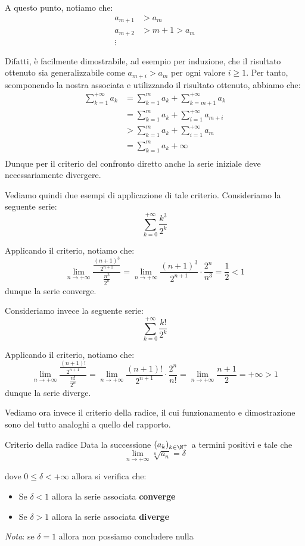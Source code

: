 \documentclass[a4paper, 12pt]{report}
\begin{document}
{        A questo punto, notiamo che:
        \[\begin{split}
            a_{m+1} &> a_m \\
            a_{m+2} &> {m+1} > a_{m}\\
            \vdots
        \end{split}\]

        Difatti, è facilmente dimostrabile, ad esempio per induzione, che il risultato ottenuto sia generalizzabile come $a_{m+i} > a_m$ per ogni valore $i \geq 1$.  Per tanto, scomponendo la nostra associata e utilizzando il risultato ottenuto, abbiamo che:
        \[\begin{split}
            \sum_{k = 1}^{+\infty} a_k &= \sum_{k = 1}^{m} a_k + \sum_{k = m+1}^{+\infty} a_k\\
            &= \sum_{k = 1}^{m} a_k + \sum_{i = 1}^{+\infty} a_{m+i} \\
            &> \sum_{k = 1}^{m} a_k + \sum_{i = 1}^{+\infty} a_{m} \\
            &= \sum_{k = 1}^{m} a_k + \infty \\
        \end{split}\]
        Dunque per il criterio del confronto diretto anche la serie iniziale deve necessariamente divergere.

    }

    Vediamo quindi due esempi di applicazione di tale criterio. Consideriamo la seguente serie:
    \[\sum_{k = 0}^{+\infty} \frac{k^3}{2^k}\]

    Applicando il criterio, notiamo che:
    \[\lim_{n \to +\infty} \frac{\frac{(n+1)^3}{2^{n+1}}}{\frac{n^3}{2^n}} = \lim_{n \to +\infty} \frac{(n+1)^3}{2^{n+1}} \cdot \frac{2^n}{n^3} = \frac{1}{2} < 1\]
    dunque la serie converge.

    Consideriamo invece la seguente serie:
    \[\sum_{k = 0}^{+\infty} \frac{k!}{2^k}\]

    Applicando il criterio, notiamo che:
    \[\lim_{n \to +\infty} \frac{\frac{(n+1)!}{2^{n+1}}}{\frac{n!}{2^n}} = \lim_{n \to +\infty} \frac{(n+1)!}{2^{n+1}} \cdot \frac{2^n}{n!} = \lim_{n \to +\infty} \frac{n+1}{2} = +\infty > 1\]
    dunque la serie diverge.

    Vediamo ora invece il criterio della radice, il cui funzionamento e dimostrazione sono del tutto analoghi a quello del rapporto.

    \begin{framedthm}{Criterio della radice}
        Data la successione $(a_k)_{k \in \N^+}$ a termini positivi e tale che
        \[ \lim_{n \to +\infty} \sqrt[n]{a_n} = \delta\]
        
        dove $0 \leq \delta < +\infty$ allora si verifica che:
        \begin{itemize}
            \item Se $\delta < 1$ allora la serie associata \textbf{converge}
            \item Se $\delta > 1$ allora la serie associata \textbf{diverge}
        \end{itemize}
        
        \textit{Nota}: se $\delta = 1$ allora non possiamo concludere nulla
    \end{framedthm}
\end{document}
